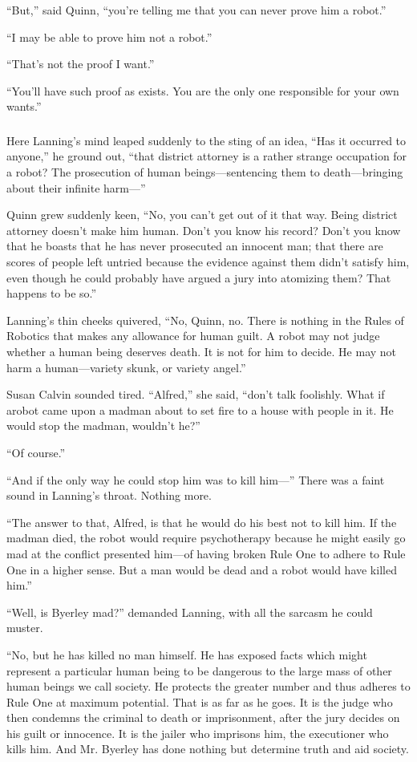 \documentclass[10pt,a5paper,twoside]{book}
\begin{document}
“But,” said Quinn, “you’re telling me that you can never prove him a robot.”

“I may be able to prove him not a robot.”

“That’s not the proof I want.”

“You’ll have such proof as exists. You are the only one responsible for your own wants.”

\subsubsection*{}
Here Lanning’s mind leaped suddenly to the sting of an idea, “Has it occurred to anyone,” he ground out, “that district attorney is a rather strange occupation for a robot? The prosecution of human beings—sentencing them to death—bringing about their infinite harm—”

Quinn grew suddenly keen, “No, you can’t get out of it that way. Being district attorney doesn’t make him human. Don’t you know his record? Don’t you know that he boasts that he has never prosecuted an innocent man; that there are scores of people left untried because the evidence against them didn’t satisfy him, even though he could probably have argued a jury into atomizing them? That happens to be so.”

Lanning’s thin cheeks quivered, “No, Quinn, no. There is nothing in the Rules of Robotics that makes any allowance for human guilt. A robot may not judge whether a human being deserves death. It is not for him to decide. He may not harm a human—variety skunk, or variety angel.”

Susan Calvin sounded tired. “Alfred,” she said, “don’t talk foolishly. What if arobot came upon a madman about to set fire to a house with people in it. He would stop the madman, wouldn’t he?”

“Of course.”

“And if the only way he could stop him was to kill him—” There was a faint sound in Lanning’s throat. Nothing more.

“The answer to that, Alfred, is that he would do his best not to kill him. If the madman died, the robot would require psychotherapy because he might easily go mad at the conflict presented him—of having broken Rule One to adhere to Rule One in a higher sense. But a man would be dead and a robot would have killed him.”

“Well, is Byerley mad?” demanded Lanning, with all the sarcasm he could muster.

“No, but he has killed no man himself. He has exposed facts which might represent a particular human being to be dangerous to the large mass of other human beings we call society. He protects the greater number and thus adheres to Rule One at maximum potential. That is as far as he goes. It is the judge who then condemns the criminal to death or imprisonment, after the jury decides on his guilt or innocence. It is the jailer who imprisons him, the executioner who kills him. And Mr. Byerley has done nothing but determine truth and aid society.
\end{document}
